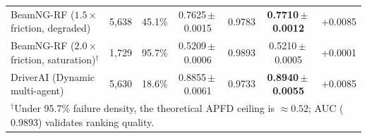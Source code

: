\begin{table}[t]
{\begin{tabular}{lrrcccc}
BeamNG-RF ($1.5\times$ friction, degraded) & 5{,}638 & 45.1\% & 0.7625\,$\pm$\,0.0015 & 0.9783 & \textbf{0.7710\,$\pm$\,0.0012} & +0.0085 \\
BeamNG-RF ($2.0\times$ friction, saturation)$^\dagger$ & 1{,}729 & 95.7\% & 0.5209\,$\pm$\,0.0006 & 0.9893 & 0.5210\,$\pm$\,0.0005 & +0.0001 \\
DriverAI (Dynamic multi-agent) & 5{,}630 & 18.6\% & 0.8855\,$\pm$\,0.0061 & 0.9733 & \textbf{0.8940\,$\pm$\,0.0055} & +0.0085 \\
\bottomrule
\multicolumn{7}{l}{\footnotesize $^\dagger$Under 95.7\% failure density, the theoretical APFD ceiling is $\approx 0.52$; AUC ($0.9893$) validates ranking quality.} \\
\end{tabular}%
}
\end{table}

